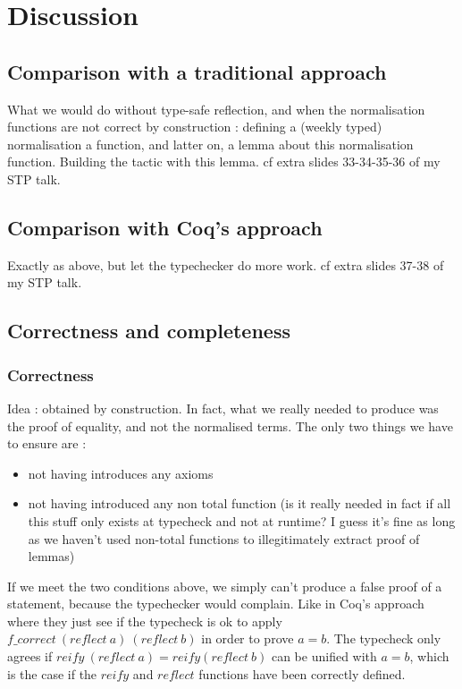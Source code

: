 \section {Discussion}

	\subsection{Comparison with a traditional approach}

What we would do without type-safe reflection, and when the normalisation functions are not correct by construction : defining a (weekly typed) normalisation a function, and latter on, a lemma about this normalisation function. Building the tactic with this lemma.
cf extra slides 33-34-35-36 of my STP talk.

	\subsection {Comparison with Coq's approach}
	
Exactly as above, but let the typechecker do more work.
cf extra slides 37-38 of my STP talk.

	\subsection {Correctness and completeness}

		\subsubsection{Correctness}
		
Idea : obtained by construction. In fact, what we really needed to produce was the proof of equality, and not the normalised terms. The only two things we have to ensure are :
\begin{itemize}
\item not having introduces any axioms
\item not having introduced any non total function (is it really needed in fact if all this stuff only exists at typecheck and not at runtime? I guess it's fine as long as we haven't used non-total functions to illegitimately extract proof of lemmas)
\end{itemize}

If we meet the two conditions above, we simply can't produce a false proof of a statement, because the typechecker would complain. Like in Coq's approach where they just see if the typecheck is ok to apply $f\_correct\ (reflect\ a)\ (reflect\ b)$ in order to prove $a=b$. The typecheck only agrees if $reify\ (reflect\ a) = reify(reflect\ b)$ can be unified with $a=b$, which is the case if the $reify$ and $reflect$ functions have been correctly defined.
		
